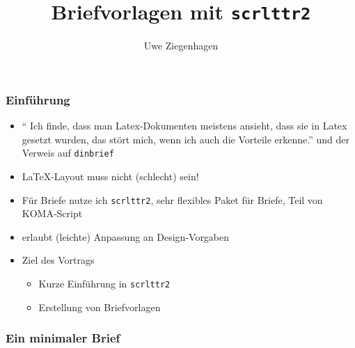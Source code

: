 \documentclass[12pt,ngerman]{beamer}
\author{Uwe Ziegenhagen}
\title{Briefvorlagen mit \texttt{scrlttr2}}
\begin{document}
\begin{frame}

\maketitle

\end{frame}

\begin{frame}
\frametitle{Einführung}

\begin{itemize}
\item \enquote{ Ich finde, dass man Latex-Dokumenten meistens ansieht, dass sie in Latex gesetzt wurden, das stört mich, wenn ich auch die Vorteile erkenne.} und der Verweis auf \texttt{dinbrief}
\item \LaTeX-Layout muss nicht (schlecht) sein!
\item Für Briefe nutze ich \texttt{scrlttr2}, sehr flexibles Paket für Briefe, Teil von KOMA-Script
\item erlaubt (leichte) Anpassung an Design-Vorgaben
\item Ziel des Vortrags

\begin{itemize}
	\item Kurze Einführung in \texttt{scrlttr2}
	\item Erstellung von Briefvorlagen
\end{itemize}


\end{itemize}
\end{frame}

\begin{frame}[fragile]
\frametitle{Ein minimaler Brief}



\end{frame}
\end{document}
